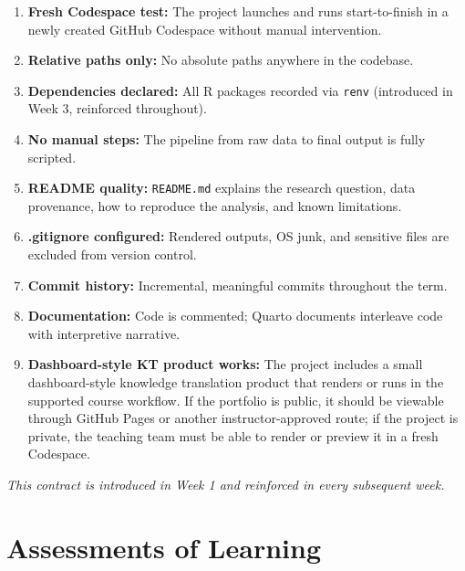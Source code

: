 \documentclass[
  letterpaper,
  DIV=11,
  numbers=noendperiod,
  oneside]{scrreprt}
\providecommand{\tightlist}{%
  \setlength{\itemsep}{0pt}\setlength{\parskip}{0pt}}
\begin{document}
\begin{enumerate}
\def\labelenumi{\arabic{enumi}.}
\tightlist
\item
  \textbf{Fresh Codespace test:} The project launches and runs
  start-to-finish in a newly created GitHub Codespace without manual
  intervention.
\item
  \textbf{Relative paths only:} No absolute paths anywhere in the
  codebase.
\item
  \textbf{Dependencies declared:} All R packages recorded via
  \texttt{renv} (introduced in Week 3, reinforced throughout).
\item
  \textbf{No manual steps:} The pipeline from raw data to final output
  is fully scripted.
\item
  \textbf{README quality:} \texttt{README.md} explains the research
  question, data provenance, how to reproduce the analysis, and known
  limitations.
\item
  \textbf{.gitignore configured:} Rendered outputs, OS junk, and
  sensitive files are excluded from version control.
\item
  \textbf{Commit history:} Incremental, meaningful commits throughout
  the term.
\item
  \textbf{Documentation:} Code is commented; Quarto documents interleave
  code with interpretive narrative.
\item
  \textbf{Dashboard-style KT product works:} The project includes a
  small dashboard-style knowledge translation product that renders or
  runs in the supported course workflow. If the portfolio is public, it
  should be viewable through GitHub Pages or another instructor-approved
  route; if the project is private, the teaching team must be able to
  render or preview it in a fresh Codespace.
\end{enumerate}

\emph{This contract is introduced in Week 1 and reinforced in every
subsequent week.}

\section{Assessments of Learning}\label{assessments-of-learning}
\end{document}
